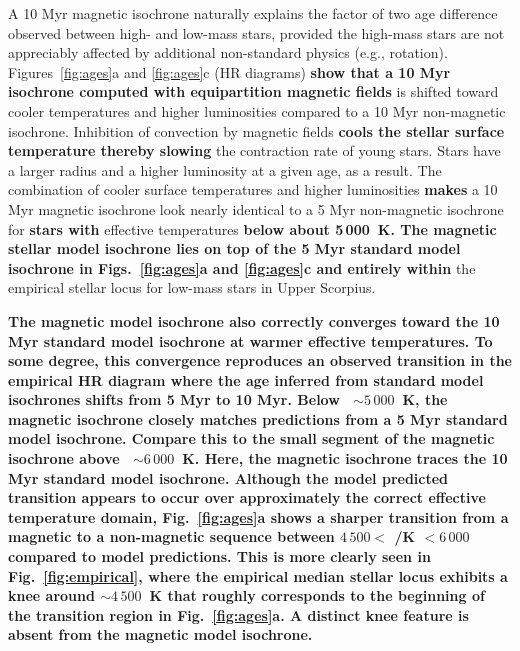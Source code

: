 \documentclass{aa}
\begin{document}
A 10 Myr magnetic isochrone naturally explains the factor of two age difference observed between high- and low-mass stars, provided the high-mass stars are not appreciably affected by additional non-standard physics (e.g., rotation). 
Figures~\ref{fig:ages}a and \ref{fig:ages}c (HR diagrams) {\bf show that a 10 Myr isochrone computed with equipartition magnetic fields} is shifted toward cooler temperatures and higher luminosities compared to a 10 Myr non-magnetic isochrone. Inhibition of convection by magnetic fields {\bf cools the stellar surface temperature thereby slowing} the contraction rate of young stars. Stars have a larger radius and a higher luminosity at a given age, as a result. The combination of cooler surface temperatures and higher luminosities {\bf makes} a 10 Myr magnetic isochrone look nearly identical to a 5 Myr non-magnetic isochrone for {\bf stars with} effective temperatures {\bf below about 5\,000~K. The magnetic stellar model isochrone lies on top of the 5 Myr standard model isochrone in Figs.~\ref{fig:ages}a and \ref{fig:ages}c and entirely within} the empirical stellar locus for low-mass stars in Upper Scorpius. 

{\bf The magnetic model isochrone also correctly converges toward the 10 Myr standard model isochrone at warmer effective temperatures. To some degree, this  convergence reproduces an observed transition in the empirical HR diagram where the age inferred from standard model isochrones shifts from 5 Myr to 10 Myr. Below \teff~$\sim 5\,000$~K, the magnetic isochrone closely matches predictions from a 5 Myr standard model isochrone. Compare this to the small segment of the magnetic isochrone above \teff\ $\sim 6\,000$~K. Here, the magnetic isochrone traces the 10 Myr standard model isochrone. Although the model predicted transition appears to occur over approximately the correct effective temperature domain, Fig.~\ref{fig:ages}a shows a sharper transition from a magnetic to a non-magnetic sequence between $4\,500 <$ \teff/K $< 6\,000$ compared to model predictions. This is more clearly seen in Fig.~\ref{fig:empirical}, where the empirical median stellar locus exhibits a knee around \teff $\sim 4\,500$~K that roughly corresponds to the beginning of the transition region in Fig.~\ref{fig:ages}a. A distinct knee feature is absent from the magnetic model isochrone.}

\end{document}
